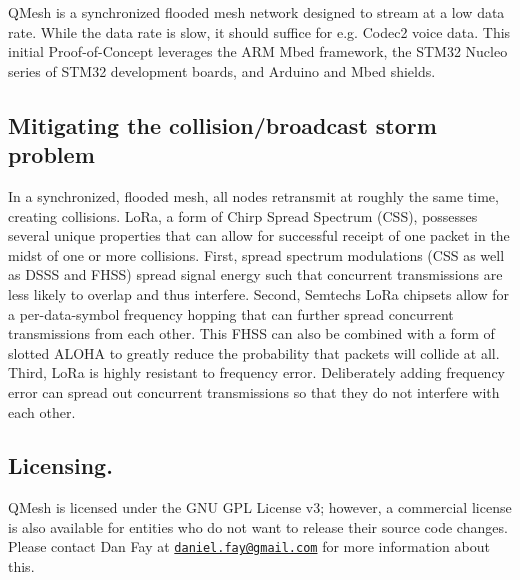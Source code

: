 Q\+Mesh is a synchronized flooded mesh network designed to stream at a low data rate. While the data rate is slow, it should suffice for e.\+g. Codec2 voice data. This initial Proof-\/of-\/\+Concept leverages the A\+RM Mbed framework, the S\+T\+M32 Nucleo series of S\+T\+M32 development boards, and Arduino and Mbed shields.

\subsection*{Mitigating the collision/broadcast storm problem}

In a synchronized, flooded mesh, all nodes retransmit at roughly the same time, creating collisions. Lo\+Ra, a form of Chirp Spread Spectrum (C\+SS), possesses several unique properties that can allow for successful receipt of one packet in the midst of one or more collisions. First, spread spectrum modulations (C\+SS as well as D\+S\+SS and F\+H\+SS) spread signal energy such that concurrent transmissions are less likely to overlap and thus interfere. Second, Semtech\textquotesingle{}s Lo\+Ra chipsets allow for a per-\/data-\/symbol frequency hopping that can further spread concurrent transmissions from each other. This F\+H\+SS can also be combined with a form of slotted A\+L\+O\+HA to greatly reduce the probability that packets will collide at all. Third, Lo\+Ra is highly resistant to frequency error. Deliberately adding frequency error can spread out concurrent transmissions so that they do not interfere with each other.

\subsection*{Licensing.}

Q\+Mesh is licensed under the G\+NU G\+PL License v3; however, a commercial license is also available for entities who do not want to release their source code changes. Please contact Dan Fay at \href{mailto:daniel.fay@gmail.com}{\tt daniel.\+fay@gmail.\+com} for more information about this. 